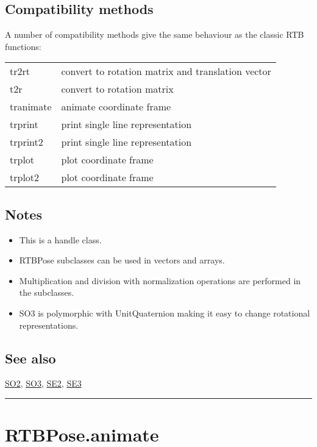 \subsection*{Compatibility methods}


A number of compatibility methods give the same behaviour as the
classic RTB functions:

\begin{longtable}{lp{120mm}}
tr2rt & convert to rotation matrix and translation vector\\ 
t2r & convert to rotation matrix\\ 
tranimate & animate coordinate frame\\ 
trprint & print single line representation\\ 
trprint2 & print single line representation\\ 
trplot & plot coordinate frame\\ 
trplot2 & plot coordinate frame\\ 
\end{longtable}\vspace{1ex}

\subsection*{Notes}
\begin{itemize}
  \item This is a handle class.
  \item RTBPose subclasses can be used in vectors and arrays.
  \item Multiplication and division with normalization operations are performed    in the subclasses.
  \item SO3 is polymorphic with UnitQuaternion making it easy to change    rotational representations.
\end{itemize}

\subsection*{See also}


\hyperlink{SO2}{\color{blue} SO2}, \hyperlink{SO3}{\color{blue} SO3}, \hyperlink{SE2}{\color{blue} SE2}, \hyperlink{SE3}{\color{blue} SE3}

\vspace{1.5ex}\hrule

\hypertarget{RTBPose.animate}{\section*{RTBPose.animate}}
